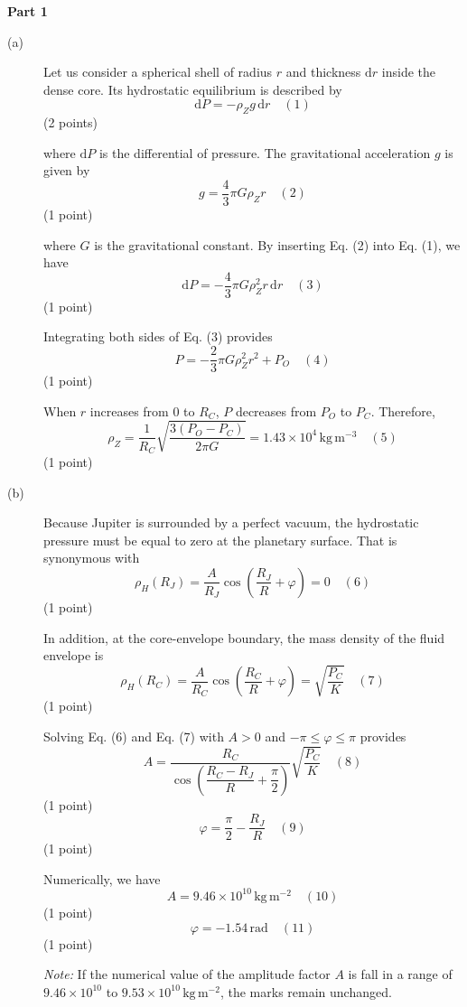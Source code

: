 \medskip\noindent\textbf{Part 1}

\begin{description}
\item[(a)] Let us consider a spherical shell of radius $r$ and thickness
  $\mathrm{d}r$ inside the dense core. Its hydrostatic equilibrium is
  described by
  \[ \mathrm{d}P = -\rho_Z g\,\mathrm{d}r \quad (1) \]
  \hfill(2 points)

  where $\mathrm{d}P$ is the differential of pressure. The gravitational
  acceleration $g$ is given by
  \[ g = \frac{4}{3}\pi G \rho_Z r \quad (2) \]
  \hfill(1 point)

  where $G$ is the gravitational constant. By inserting Eq. (2) into Eq. (1),
  we have
  \[ \mathrm{d}P = -\frac{4}{3}\pi G \rho_Z^2 r\,\mathrm{d}r \quad (3) \]
  \hfill(1 point)

  Integrating both sides of Eq. (3) provides
  \[ P = -\frac{2}{3}\pi G \rho_Z^2 r^2 + P_O \quad (4) \]
  \hfill(1 point)

  When $r$ increases from 0 to $R_C$, $P$ decreases from $P_O$ to $P_C$.
  Therefore,
  \[ \rho_Z = \frac{1}{R_C}\sqrt{\frac{3(P_O - P_C)}{2\pi G}}
     = 1.43 \times 10^{4}\,\mathrm{kg\,m^{-3}} \quad (5) \]
  \hfill(1 point)

\item[(b)] Because Jupiter is surrounded by a perfect vacuum, the hydrostatic
  pressure must be equal to zero at the planetary surface. That is synonymous
  with
  \[ \rho_H(R_J) = \frac{A}{R_J}\cos\left(\frac{R_J}{R} + \varphi\right) = 0
     \quad (6) \]
  \hfill(1 point)

  In addition, at the core-envelope boundary, the mass density of the fluid
  envelope is
  \[ \rho_H(R_C) = \frac{A}{R_C}\cos\left(\frac{R_C}{R} + \varphi\right)
     = \sqrt{\frac{P_C}{K}} \quad (7) \]
  \hfill(1 point)

  Solving Eq. (6) and Eq. (7) with $A > 0$ and $-\pi \le \varphi \le \pi$
  provides
  \[ A = \frac{R_C}{\cos\left(\dfrac{R_C - R_J}{R} + \dfrac{\pi}{2}\right)}
     \sqrt{\frac{P_C}{K}} \quad (8) \]
  \hfill(1 point)
  \[ \varphi = \frac{\pi}{2} - \frac{R_J}{R} \quad (9) \]
  \hfill(1 point)

  Numerically, we have
  \[ A = 9.46 \times 10^{10}\,\mathrm{kg\,m^{-2}} \quad (10) \]
  \hfill(1 point)
  \[ \varphi = -1.54\,\mathrm{rad} \quad (11) \]
  \hfill(1 point)

  \textit{Note:} If the numerical value of the amplitude factor $A$ is fall in
  a range of $9.46 \times 10^{10}$ to $9.53 \times 10^{10}\,\mathrm{kg\,m^{-2}}$,
  the marks remain unchanged.


\end{description}
